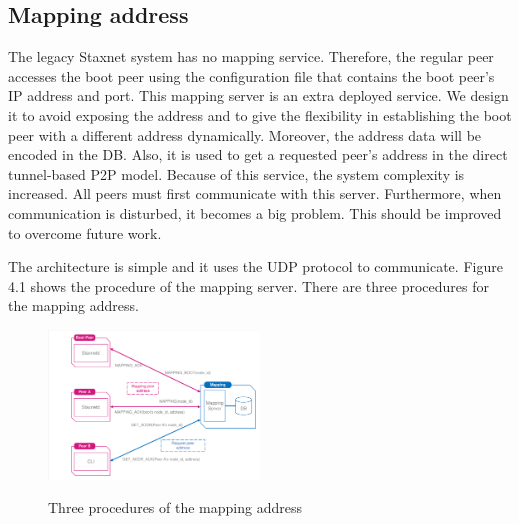 \subsection{Mapping address}

The legacy Staxnet system has no mapping service. Therefore, the regular peer accesses the boot peer using the configuration file that contains the boot peer's IP address and port. This mapping server is an extra deployed service. We design it to avoid exposing the address and to give the flexibility in establishing the boot peer with a different address dynamically. Moreover, the address data will be encoded in the DB. Also, it is used to get a requested peer's address in the direct tunnel-based P2P model. Because of this service, the system complexity is increased. All peers must first communicate with this server. Furthermore, when communication is disturbed, it becomes a big problem. This should be improved to overcome future work.

The architecture is simple and it uses the UDP protocol to communicate. Figure 4.1 shows the procedure of the mapping server. There are three procedures for the mapping address.

\begin{figure}[!ht]
	\centering
	\includegraphics[width=0.5\textwidth]{images/fig_4_1.pdf}\\
	\caption{Three procedures of the mapping address}
	\label{fig:mapping}
\end{figure}

